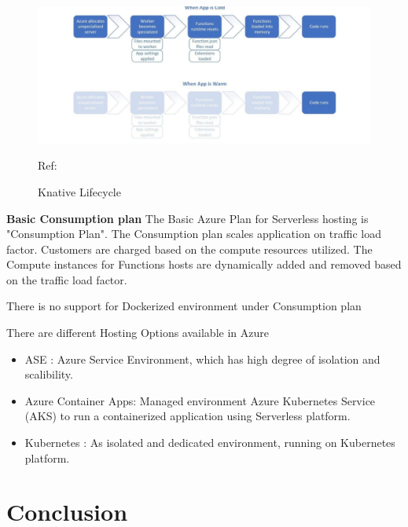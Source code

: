 \documentclass[12pt]{article}
\begin{document}
\begin{flushleft}
\begin{figure}[h]
    \centering
    \includegraphics[width=1.0\linewidth]{images/Azure_lifecycle.PNG}
    \caption{Knative Lifecycle}
        Ref: \cite{Understanding_serverless_cold_start_2018}
\end{figure}
\textbf{Basic Consumption plan}
The Basic Azure Plan for Serverless hosting is "Consumption Plan". The Consumption plan scales application on traffic load factor. Customers are charged based on the compute resources utilized. The Compute instances for Functions hosts are dynamically added and removed based on the traffic load factor.

There is no support for Dockerized environment under Consumption plan

There are different Hosting Options available in Azure 
\begin{itemize}
    \item ASE : Azure Service Environment, which has high degree of isolation and scalibility.
    \item Azure Container Apps: Managed environment Azure Kubernetes Service (AKS) to run a containerized application using Serverless platform. 
    \item Kubernetes : As isolated and dedicated environment, running on Kubernetes platform.   
\end{itemize}


\end{flushleft}
\pagebreak
\newpage
\section{Conclusion}


\pagebreak
\printbibliography
\end{document}
